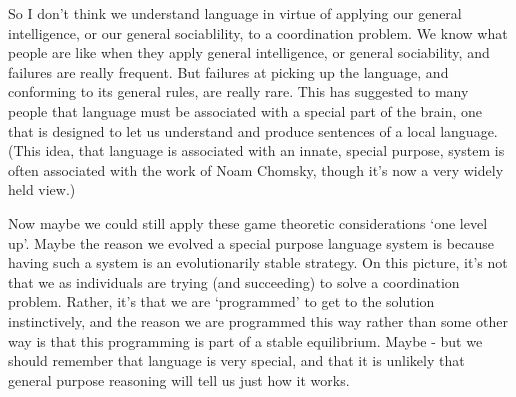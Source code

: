 \documentclass[11pt,]{article}
\begin{document}
So I don't think we understand language in virtue of applying our
general intelligence, or our general sociablility, to a coordination
problem. We know what people are like when they apply general
intelligence, or general sociability, and failures are really frequent.
But failures at picking up the language, and conforming to its general
rules, are really rare. This has suggested to many people that language
must be associated with a special part of the brain, one that is
designed to let us understand and produce sentences of a local language.
(This idea, that language is associated with an innate, special purpose,
system is often associated with the work of Noam Chomsky, though it's
now a very widely held view.)

Now maybe we could still apply these game theoretic considerations `one
level up'. Maybe the reason we evolved a special purpose language system
is because having such a system is an evolutionarily stable strategy. On
this picture, it's not that we as individuals are trying (and
succeeding) to solve a coordination problem. Rather, it's that we are
`programmed' to get to the solution instinctively, and the reason we are
programmed this way rather than some other way is that this programming
is part of a stable equilibrium. Maybe - but we should remember that
language is very special, and that it is unlikely that general purpose
reasoning will tell us just how it works.
\end{document}
